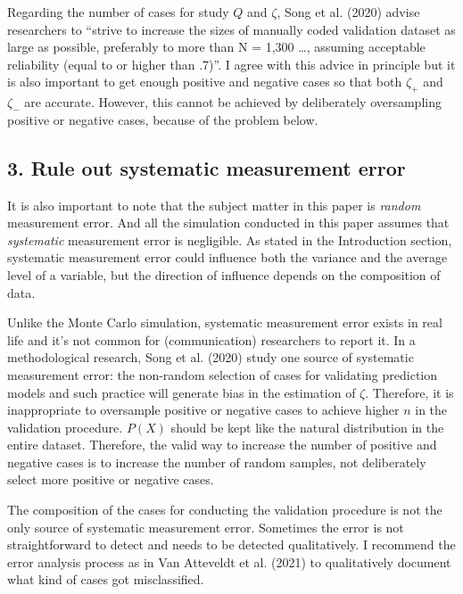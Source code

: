 \documentclass[english,man,floatsintext]{apa6}
\begin{document}
Regarding the number of cases for study \(Q\) and \(\zeta\), Song et al. (2020) advise researchers to \enquote{strive to increase the sizes of manually coded validation dataset as large as possible, preferably to more than N = 1,300 \ldots{}, assuming acceptable reliability (equal to or higher than .7)}. I agree with this advice in principle but it is also important to get enough positive and negative cases so that both \(\zeta_{+}\) and \(\zeta_{-}\) are accurate. However, this cannot be achieved by deliberately oversampling positive or negative cases, because of the problem below.

\hypertarget{rule-out-systematic-measurement-error}{%
\subsection{3. Rule out systematic measurement error}\label{rule-out-systematic-measurement-error}}

It is also important to note that the subject matter in this paper is \emph{random} measurement error. And all the simulation conducted in this paper assumes that \emph{systematic} measurement error is negligible. As stated in the Introduction section, systematic measurement error could influence both the variance and the average level of a variable, but the direction of influence depends on the composition of data.

Unlike the Monte Carlo simulation, systematic measurement error exists in real life and it's not common for (communication) researchers to report it. In a methodological research, Song et al. (2020) study one source of systematic measurement error: the non-random selection of cases for validating prediction models and such practice will generate bias in the estimation of \(\zeta\). Therefore, it is inappropriate to oversample positive or negative cases to achieve higher \(n\) in the validation procedure. \(P(X)\) should be kept like the natural distribution in the entire dataset. Therefore, the valid way to increase the number of positive and negative cases is to increase the number of random samples, not deliberately select more positive or negative cases.

The composition of the cases for conducting the validation procedure is not the only source of systematic measurement error. Sometimes the error is not straightforward to detect and needs to be detected qualitatively. I recommend the error analysis process as in Van Atteveldt et al. (2021) to qualitatively document what kind of cases got misclassified.
\end{document}

